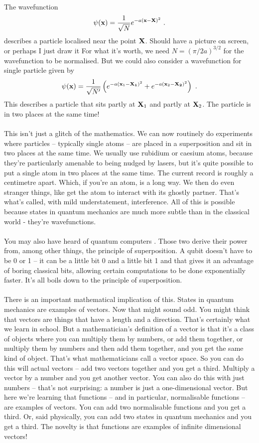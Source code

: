 \documentclass[12pt]{article}
\def\be{\begin{eqnarray}}
\def\ee{\end{eqnarray}}
\newcommand{\nn}{\nonumber}
\newcommand\para{\paragraph{}}
\newcommand{\bx}{{\bf x}}
\begin{document}
\para
{\color{olive} The wavefunction 
%
\be \psi(\bx) = \frac{1}{\sqrt{N}} e^{-a(\bx-{\bf X})^2}\ .\nn\ee
%
describes a particle localised near the point ${\bf X}$.} {\color{blue} Should have a picture on screen, or perhaps I just draw it} {\color{olive} For what it's worth, we need $N=(\pi/2a)^{3/2}$ for the wavefunction to be normalised. But we could also consider a wavefunction for single particle given by
%
\be \psi(\bx) = \frac{1}{\sqrt{N'}} \left(e^{-a(\bx_1-{\bf X_1})^2} + e^{-a(\bx_2-{\bf X_2})^2}\right)\ .\nn\ee
%
This describes a particle that sits partly at ${\bf X}_1$ and partly at ${\bf X}_2$. The particle is in two places at the same time!}

\para
This isn't just a glitch of the mathematics. We can now routinely do experiments where particles -- typically single atoms -- are placed in a superposition and sit in two places at the same time. We usually use rubidium or caesium atoms, because they're particularly amenable to being nudged by lasers, but it's quite possible to put a single atom in two places at the same time. The current record is roughly a centimetre apart. Which, if you're an atom, is a long way.  We then do even stranger things, like get the atom to interact with its ghostly partner. That's what's called, with mild understatement, interference. All of this is possible because states in quantum mechanics are much more subtle than in the classical world - they're wavefunctions.

\para
You may also have heard of quantum computers . Those two derive their power from, among other things, the principle of superposition. A qubit doesn't have to be 0 or 1 -- it can be a little bit 0 and a little bit 1 and that gives it an advantage of boring classical bits, allowing certain computations to be done exponentially faster. It's all boils down to the principle of superposition. 


\para
There is an important mathematical implication of this. States in quantum mechanics are examples of vectors. Now that might sound odd. You might think that vectors are things that have a length and a direction. That's certainly what we learn in school. But a mathematician's definition of a vector is that it's a class of objects where you can multiply them by numbers, or add them together, or multiply them by numbers and then add them together, and you get the same kind of object. That's what mathematicians call a vector space. So you can do this will actual vectors -- add two vectors together and you get a third. Multiply a vector by a number and you get another vector. You can also do this with just numbers -- that's not surprising: a number is just a one-dimensional vector. But here we're learning that functions -- and in particular, normalisable functions -- are examples of vectors. You can add two normalisable functions and you get a third. Or, said physically, you can add two states in quantum mechanics and you get a third. The novelty is that functions are examples of infinite dimensional vectors! 
\end{document}
